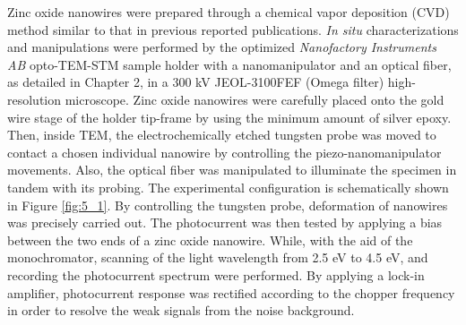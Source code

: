 Zinc oxide nanowires were prepared through a chemical vapor deposition (CVD) method similar to that in previous reported publications.\cite{Xu2015b}
{\em In situ} characterizations and manipulations were performed by the optimized {\em Nanofactory Instruments AB} opto-TEM-STM sample holder with a nanomanipulator and an optical fiber, as detailed in Chapter 2, in a 300 kV JEOL-3100FEF (Omega filter) high-resolution microscope. 
Zinc oxide nanowires were carefully placed onto the gold wire stage of the holder tip-frame by using the minimum amount of silver epoxy. 
Then, inside TEM, the electrochemically etched tungsten probe was moved to contact a chosen individual nanowire by controlling the piezo-nanomanipulator movements. Also, the optical fiber was manipulated to illuminate the specimen in tandem with its probing. 
The experimental configuration is schematically shown in Figure \ref{fig:5_1}. 
By controlling the tungsten probe, deformation of nanowires was precisely carried out. 
The photocurrent was then tested by applying a bias between the two ends of a zinc oxide nanowire. While, with the aid of the monochromator, scanning of the light wavelength from 2.5 eV to 4.5 eV, and recording the photocurrent spectrum were performed. 
By applying a lock-in amplifier, photocurrent response was rectified according to the chopper frequency in order to resolve the weak signals from the noise background. 

